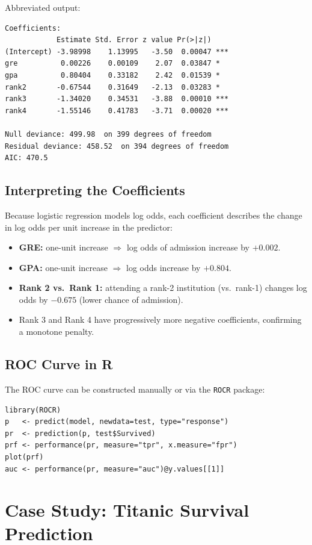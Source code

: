 \documentclass[11pt]{article}
\begin{document}
Abbreviated output:
\begin{verbatim}
Coefficients:
            Estimate Std. Error z value Pr(>|z|)
(Intercept) -3.98998    1.13995   -3.50  0.00047 ***
gre          0.00226    0.00109    2.07  0.03847 *
gpa          0.80404    0.33182    2.42  0.01539 *
rank2       -0.67544    0.31649   -2.13  0.03283 *
rank3       -1.34020    0.34531   -3.88  0.00010 ***
rank4       -1.55146    0.41783   -3.71  0.00020 ***

Null deviance: 499.98  on 399 degrees of freedom
Residual deviance: 458.52  on 394 degrees of freedom
AIC: 470.5
\end{verbatim}

\subsection{Interpreting the Coefficients}
Because logistic regression models log odds, each coefficient
describes the change in log odds per unit increase in the predictor:
\begin{itemize}
    \item \textbf{GRE:} one-unit increase $\Rightarrow$ log odds of
      admission increase by $+0.002$.
    \item \textbf{GPA:} one-unit increase $\Rightarrow$ log odds
      increase by $+0.804$.
    \item \textbf{Rank 2 vs.\ Rank 1:} attending a rank-2 institution
      (vs.\ rank-1) changes log odds by $-0.675$ (lower chance of
      admission).
    \item Rank 3 and Rank 4 have progressively more negative
      coefficients, confirming a monotone penalty.
\end{itemize}

\subsection{ROC Curve in R}
The ROC curve can be constructed manually or via the \texttt{ROCR}
package:
\begin{verbatim}
library(ROCR)
p   <- predict(model, newdata=test, type="response")
pr  <- prediction(p, test$Survived)
prf <- performance(pr, measure="tpr", x.measure="fpr")
plot(prf)
auc <- performance(pr, measure="auc")@y.values[[1]]
\end{verbatim}


\newpage
\section{Case Study: Titanic Survival Prediction}
\end{document}
